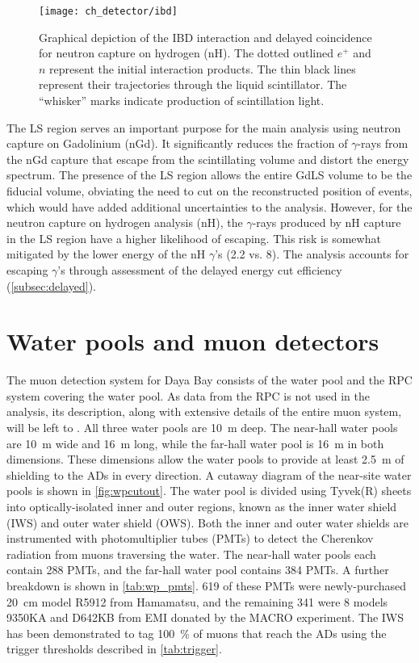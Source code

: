 \begin{figure}
    \centering
    \texttt{[image: ch\_detector/ibd]}
    \caption[Inverse Beta Decay diagram]{
        Graphical depiction of the IBD interaction and delayed coincidence
        for neutron capture on hydrogen (nH).
        The dotted outlined $e^+$ and $n$ represent the initial interaction products.
        The thin black lines represent their trajectories
        through the liquid scintillator.
        The ``whisker'' marks indicate production of scintillation light.
    }
    \label{fig:ibd_cartoon}
\end{figure}

The LS region serves an important purpose for the main \thetaot{}
analysis using neutron capture on Gadolinium (nGd).
It significantly reduces the fraction of $\gamma$-rays from the nGd capture
that escape from the scintillating volume and distort the energy spectrum.
The presence of the LS region allows the entire GdLS volume to be
the fiducial volume, obviating the need to cut on the reconstructed position
of events, which would have added additional uncertainties to the analysis.
However, for the neutron capture on hydrogen analysis (nH),
the $\gamma$-rays produced by nH capture in the LS region
have a higher likelihood of escaping.
This risk is somewhat mitigated by the lower energy of the nH $\gamma$'s
(\SI{2.2}{\mev} vs. \SI{8}{\mev}).
The \thetaot{} analysis accounts for escaping $\gamma$'s
through assessment of the delayed energy cut efficiency (\cref{subsec:delayed}).


\section{Water pools and muon detectors}
\label{sec:wp}

The muon detection system for Daya Bay consists of
the water pool and the RPC system covering the water pool.
As data from the RPC is not used in the \thetaot{} analysis,
its description, along with extensive details of the entire muon system,
will be left to \cite{muonsystem2015}.
All three water pools are \SI{10}{\m} deep.
The near-hall water pools are \SI{10}{\m} wide and \SI{16}{\m} long,
while the far-hall water pool is \SI{16}{\m} in both dimensions.
These dimensions allow the water pools to provide at least \SI{2.5}{\m} of shielding
to the ADs in every direction.
A cutaway diagram of the near-site water pools is shown in \cref{fig:wpcutout}.
The water pool is divided using Tyvek(R) sheets
into optically-isolated inner and outer regions,
known as the inner water shield (IWS) and outer water shield (OWS).
Both the inner and outer water shields are instrumented with photomultiplier tubes (PMTs)
to detect the Cherenkov radiation from muons traversing the water.
The near-hall water pools each contain \num{288} PMTs,
and the far-hall water pool contains \num{384} PMTs.
A further breakdown is shown in \cref{tab:wp_pmts}.
\num{619} of these PMTs were newly-purchased \SI{20}{\cm}
model R5912 from Hamamatsu,
and the remaining \num{341} were \SI{8}{\inch} models 9350KA
and D642KB from EMI
donated by the MACRO experiment.
The IWS has been demonstrated to tag \SI{100}{\percent} of muons
that reach the ADs using the trigger thresholds described in \cref{tab:trigger}.



